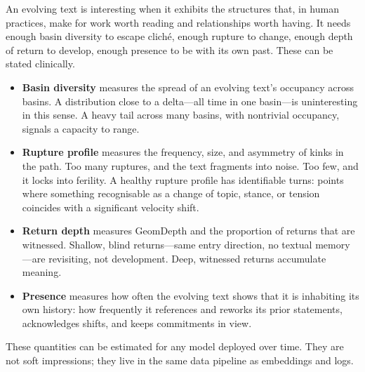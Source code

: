 \documentclass[12pt,a4paper]{report}
\begin{document}
An evolving text is interesting when it exhibits the structures that, in human practices, make for work worth reading and relationships worth having. It needs enough basin diversity to escape cliché, enough rupture to change, enough depth of return to develop, enough presence to be with its own past. These can be stated clinically.

\begin{itemize}
  \item \textbf{Basin diversity} measures the spread of an evolving text's occupancy across basins. A distribution close to a delta---all time in one basin---is uninteresting in this sense. A heavy tail across many basins, with nontrivial occupancy, signals a capacity to range.

  \item \textbf{Rupture profile} measures the frequency, size, and asymmetry of kinks in the path. Too many ruptures, and the text fragments into noise. Too few, and it locks into ferility. A healthy rupture profile has identifiable turns: points where something recognisable as a change of topic, stance, or tension coincides with a significant velocity shift.

  \item \textbf{Return depth} measures GeomDepth and the proportion of returns that are witnessed. Shallow, blind returns---same entry direction, no textual memory---are revisiting, not development. Deep, witnessed returns accumulate meaning.

  \item \textbf{Presence} measures how often the evolving text shows that it is inhabiting its own history: how frequently it references and reworks its prior statements, acknowledges shifts, and keeps commitments in view.
\end{itemize}

These quantities can be estimated for any model deployed over time. They are not soft impressions; they live in the same data pipeline as embeddings and logs.
\end{document}

